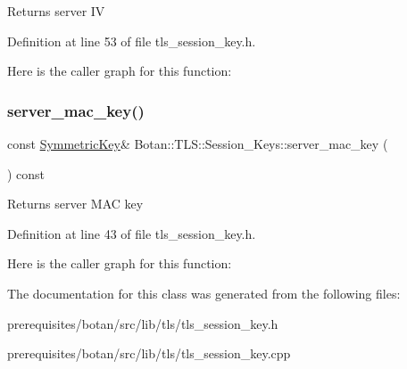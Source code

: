 \begin{DoxyReturn}{Returns}
server IV 
\end{DoxyReturn}


Definition at line 53 of file tls\+\_\+session\+\_\+key.\+h.

Here is the caller graph for this function\+:
\mbox{\label{class_botan_1_1_t_l_s_1_1_session___keys_a451ac996c71f1110883ca51fc5c85e2f}} 
\subsubsection{\texorpdfstring{server\+\_\+mac\+\_\+key()}{server\_mac\_key()}}
{\footnotesize\ttfamily const \mbox{\hyperlink{namespace_botan_a89cf6c3513428f524454d01830221a88}{Symmetric\+Key}}\& Botan\+::\+T\+L\+S\+::\+Session\+\_\+\+Keys\+::server\+\_\+mac\+\_\+key (\begin{DoxyParamCaption}{ }\end{DoxyParamCaption}) const\hspace{0.3cm}{\ttfamily [inline]}}

\begin{DoxyReturn}{Returns}
server M\+AC key 
\end{DoxyReturn}


Definition at line 43 of file tls\+\_\+session\+\_\+key.\+h.

Here is the caller graph for this function\+:


The documentation for this class was generated from the following files\+:\begin{DoxyCompactItemize}
\item 
prerequisites/botan/src/lib/tls/tls\+\_\+session\+\_\+key.\+h\item 
prerequisites/botan/src/lib/tls/tls\+\_\+session\+\_\+key.\+cpp\end{DoxyCompactItemize}
